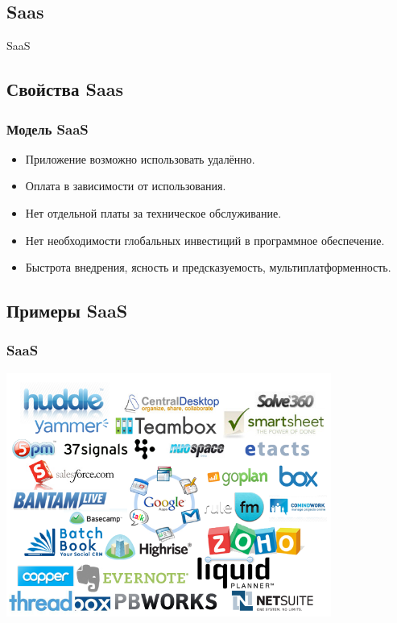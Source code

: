 \documentclass[compress,red]{beamer}
\begin{document}
\subsection{Saas}
\begin{frame}
  \begin{center}
    \Huge{SaaS}
  \end{center}
\end{frame}

\subsection{Свойства Saas}
\begin{frame}[fragile]
  \frametitle{Модель SaaS}
  \begin{itemize}
    \item Приложение возможно использовать удалённо.
    \item Оплата в зависимости от использования.
    \item Нет отдельной платы за техническое обслуживание.
    \item Нет необходимости глобальных инвестиций в программное обеспечение.
    \item Быстрота внедрения, ясность и предсказуемость, мультиплатформенность.
  \end{itemize}
\end{frame}

\subsection{Примеры SaaS}
\begin{frame}[fragile]
  \frametitle{SaaS}
  \centerline{\includegraphics[width=0.8\textwidth]{images/saas.png}}
\end{frame}
\end{document}
